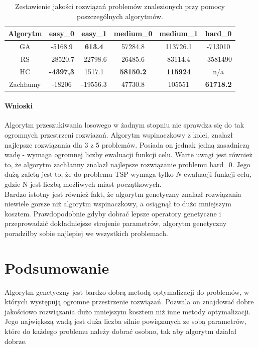 \documentclass{article}
\begin{document}
	\begin{table}[H]
		\begin{center}
			\begin{tabular}{ |c|c|c|c|c|c| } 
				\hline
				Algorytm & easy\_0 & easy\_1 & medium\_0 & medium\_1 & hard\_0 \\ 
				\hline
				GA & -5168.9 & \textbf{613.4} & 57284.8 & 113726.1 & -713010 \\ 
				RS & -28520.7 & -22798.6 & 26485.6 & 83114.4 & -3581490 \\ 
				HC & \textbf{-4397,3} & 1517.1 & \textbf{58150.2} & \textbf{115924} & n/a \\ 
				Zachłanny & -18206 & -19556.3 & 47730.8 & 105551 & \textbf{61718.2} \\ 
				\hline
			\end{tabular}
			\caption{Zestawienie jakości rozwiązań problemów znalezionych przy pomocy poszczególnych algorytmów.}
			\label{tab:nev}
		\end{center}
	\end{table}
	
	\paragraph{Wnioski}
	Algorytm przeszukiwania losowego w żadnym stopniu nie sprawdza się do tak ogromnych przestrzeni rozwiazań. Algorytm wspinaczkowy z kolei, znalazł najlepsze rozwiązania dla 3 z 5 problemów. Posiada on jednak jedną zasadniczą wadę - wymaga ogromnej liczby ewaluacji funkcji celu. Warte uwagi jest również to, że algorytm zachłanny znalazł najlepsze rozwiązanie problemu hard\_0. Jego dużą zaletą jest to, że do problemu TSP wymaga tylko $N$ ewaluacji funkcji celu, gdzie N jest liczbą możliwych miast początkowych.\\
	Bardzo istotny jest również fakt, że algorytm genetyczny znalazł rozwiązania niewiele gorsze niż algorytm wspinaczkowy, a osiągnął to dużo mniejszym kosztem. Prawdopodobnie gdyby dobrać lepsze operatory genetyczne i przeprowadzić dokładniejsze strojenie parametrów, algorytm genetyczny poradziłby sobie najlepiej we wszystkich problemach.
	\section{Podsumowanie}
	Algorytm genetyczny jest bardzo dobrą metodą optymalizacji do problemów, w których występują ogromne przestrzenie rozwiązań. Pozwala on znajdować dobre jakościowo rozwiązania dużo mniejszym kosztem niż inne metody optymalizacji. Jego największą wadą jest duża liczba silnie powiązanych ze sobą parametrów, które do każdego problemu należy dobrać osobno, tak aby algorytm działał dobrze.
\end{document}

